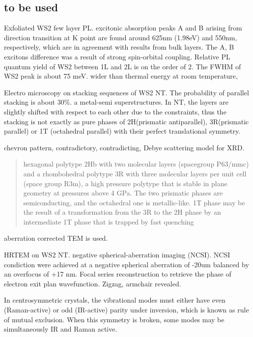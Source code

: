 \subsection{to be used}

Exfoliated WS2 few layer PL.\cite{Zhao2012} excitonic absorption peaks A and B arising from direction transition at K point are found around 625nm (1.98eV) and 550nm, respectively, which are in agreement with results from bulk layers. The A, B excitons difference was a result of strong spin-orbital coupling. Relative PL quantum yield of WS2 between 1L and 2L is on the order of 2. The FWHM of WS2 peak is about 75 meV. wider than thermal energy at room temperature,

Electro microscopy on stacking sequences of WS2 NT.\cite{Houben2012} The probability of parallel stacking is about 30\%. a metal-semi superstructures. In NT, the layers are slightly shifted with respect to each other due to the constraints, thus the stacking is not exactly as pure phases of 2H(prismatic antiparallel), 3R(prismatic parallel) or 1T (octahedral parallel) with their perfect translational symmetry.

chevron pattern, contradictory, contradicting, Debye scattering model for XRD.

\begin{quote}
hexagonal polytype 2Hb with two molecular layers (spacegroup P63/mmc) and a rhombohedral polytype 3R with three molecular layers per unit cell (space group R3m), a high pressure polytype that is stable in plane geometry at pressures above 4 GPa. The two prismatic phases are semiconducting, and the octahedral one is metallic-like.
1T phase may be the result of a transformation from the 3R to the 2H phase by an intermediate 1T phase that is trapped by fast quenching
\end{quote}

aberration corrected TEM is used.

HRTEM on WS2 NT.\cite{Sadan2008} negative spherical-aberration imaging (NCSI). NCSI condiction were achieved at a negative spherical aberration of -20um balanced by an overfocus of +17 nm. Focal series reconstruction to retrieve the phase of electron exit plan wavefunction. Zigzag, armchair revealed.

In centrosymmetric crystals, the vibrational modes must either have even (Raman-active) or odd (IR-active) parity under inversion, which is known as rule of mutual exclusion. When this symmetry is broken, some modes may be simultaneously IR and Raman active.


